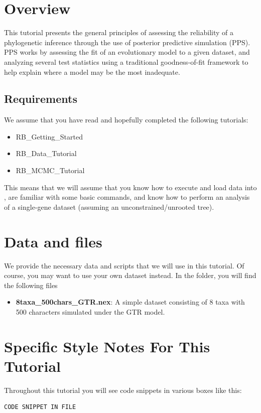 \newenvironment{Snugshade}[1][236,236,236]{
  \definecolor{shadecolor}{RGB}{#1}%
  \begin{snugshade}%
}{%
    \end{snugshade}%
}
\section{Overview}


This tutorial presents the general principles of assessing the reliability of a phylogenetic inference through the use
of posterior predictive simulation (PPS). PPS works by assessing the fit of an evolutionary model to a given dataset,
and analyzing several test statistics using a traditional goodness-of-fit framework to help explain where a model
may be the most inadequate. 

\subsection{Requirements}
We assume that you have read and hopefully completed the following tutorials:
\begin{itemize}
\item RB\_Getting\_Started
\item RB\_Data\_Tutorial
\item RB\_MCMC\_Tutorial
\end{itemize}
This means that we will assume that you know how to execute and load data into \RevBayes, are familiar 
with some basic commands, and know how to perform an analysis of a single-gene dataset (assuming an 
unconstrained/unrooted tree).


\section{Data and files}

We provide the necessary data and scripts that we will use in this tutorial.
Of course, you may want to use your own dataset instead.
In the  folder, you will find the following files
\begin{itemize}
\item \textbf{8taxa\_500chars\_GTR.nex}: A simple dataset consisting of 8 taxa with 500 characters simulated under the GTR model.
\end{itemize}

\section{Specific Style Notes For This Tutorial}
Throughout this tutorial you will see code snippets in various boxes like this: 
{\tt \begin{snugshade*}
\begin{lstlisting}
CODE SNIPPET IN FILE
\end{lstlisting}
\end{snugshade*}}

